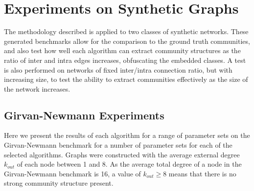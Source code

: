 \chapter{Experiments on Synthetic Graphs}

The methodology described is applied to two classes of synthetic networks. These generated benchmarks allow for the comparison to the ground truth communities, and also test how well each algorithm can extract community structures as the ratio of inter and intra edges increases, obfuscating the embedded classes. A test is also performed on networks of fixed inter/intra connection ratio, but with increasing size, to test the ability to extract communities effectively as the size of the network increases.

\section{Girvan-Newmann Experiments}
Here we present the results of each algorithm for a range of parameter sets on the Girvan-Newmann benchmark for a number of parameter sets for each of the selected algorithms. Graphs were constructed with the average external degree $k_{out}$  of each node between 1 and 8. As the average total degree of a node in the Girvan-Newmann benchmark is 16, a value of $k_{out}\geq8$ means that there is no strong community structure present.






